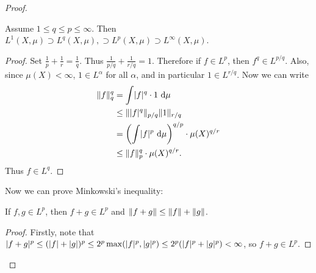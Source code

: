 \documentclass[10pt, twoside]{article}
\renewcommand{\d}{\ \mathrm{d}}
\begin{document}
\begin{thm}
\begin{proof}
            \begin{mdframed}[style=default] \begin{cor} Assume $1 \leq q \leq p
                \leq \infty$. Then $L^1(X,\mu) \supset L^q(X,\mu), \supset
                L^p(X,\mu) \supset L^{\infty}(X,\mu)$.  \end{cor} \begin{proof}
                Set $\frac{1}{p} + \frac{1}{r} = \frac{1}{q}$. Thus
                $\frac{1}{p/q} + \frac{1}{r/q} = 1$. Therefore if $f \in L^p$,
                then $f^{q} \in L^{p/q}$. Also, since $\mu(X) < \infty$, $1 \in
                L^{\alpha}$ for all $\alpha$, and in particular $1 \in
                L^{r/q}$. Now we can write \begin{align*} \norm{f}_q^q &= \int
                    \abs{f}^q \cdot 1 \d \mu \\ &\leq \norm{\abs{f}^q}_{p/q}
                    \norm{1}_{r/q} \\ &= \left( \int \abs{f}^p \d \mu
                    \right)^{q/p} \cdot \mu(X)^{q/r} \\ &\leq \norm{f}_p^{q}
                    \cdot \mu(X)^{q/r}.  \end{align*} Thus $f \in L^q$.
                \end{proof} \end{mdframed}

            Now we can prove Minkowski's inequality:
            \begin{mdframed}[style=default] \begin{thm}
                If $f,g \in L^p$, then $f + g \in L^p$ and $\lVert f+g\rVert \leq
                \lVert f\rVert + \lVert g\rVert$.  \end{thm} \begin{proof} Firstly, note
                that $\lvert f+g\rvert^p \leq (\lvert f\rvert + \lvert g\rvert)^p \leq
                2^p\max(\lvert f\rvert^p, \lvert g\rvert^p) \leq 2^p(\lvert f\rvert^p + \lvert g\rvert^p) <
                \infty$, so $f+g \in L^p$.


\end{proof}
\end{mdframed}
\end{proof}
\end{thm}
\end{document}
